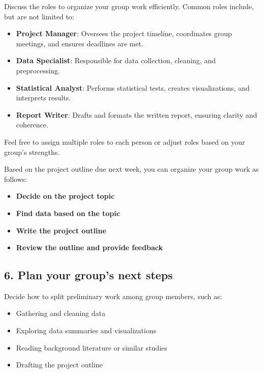 \documentclass[12pt]{article}
\begin{document}
Discuss the roles to organize your group work efficiently.  
Common roles include, but are not limited to:  
\begin{itemize}
    \item \textbf{Project Manager}: Oversees the project timeline, coordinates group meetings, and ensures deadlines are met.  
    \item \textbf{Data Specialist}: Responsible for data collection, cleaning, and preprocessing.  
    \item \textbf{Statistical Analyst}: Performs statistical tests, creates visualizations, and interprets results.  
    \item \textbf{Report Writer}: Drafts and formats the written report, ensuring clarity and coherence.  
\end{itemize}

Feel free to assign multiple roles to each person or adjust roles based on your group’s strengths.

Based on the project outline due next week, you can organize your group work as follows:
\begin{itemize}
    \item \textbf{Decide on the project topic}  
    \item \textbf{Find data based on the topic}
    \item \textbf{Write the project outline} 
    \item \textbf{Review the outline and provide feedback}
\end{itemize}


\vspace{2\baselineskip}

\subsection*{6. Plan your group's next steps}

Decide how to split preliminary work among group members, such as:  
\begin{itemize}
    \item Gathering and cleaning data  
    \item Exploring data summaries and visualizations  
    \item Reading background literature or similar studies  
    \item Drafting the project outline  
\end{itemize}

\vspace{2\baselineskip}
\end{document}
